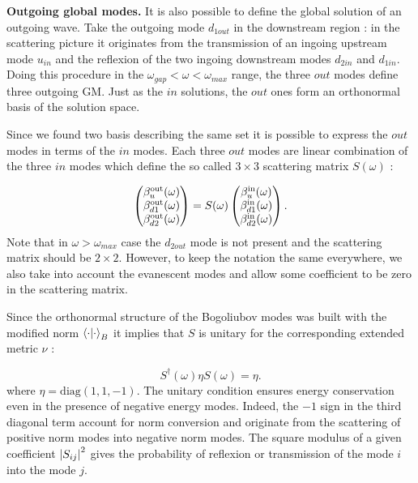 \bigskip

\textbf{Outgoing global modes.} It is also possible to define the global solution of an outgoing wave. Take the outgoing mode $d_{1out}$ in the downstream region : in the scattering picture it originates from 
 the transmission of an ingoing upstream mode $u_{in}$ and the reflexion of the two ingoing downstream modes $d_{2in}$ and $d_{1in}$. Doing this procedure in the $\omega_{gap}<\omega<\omega_{max}$ range, the three $out$ modes
define three outgoing GM. Just as the $in$ solutions, the $out$ ones form an orthonormal basis of the solution space.

Since we found two basis describing the same set it is possible to express the $out$ modes in terms of the $in$ modes. 
Each three $out$ modes are linear combination of the three $in$ modes which define the so called $3\times3$ scattering matrix $S(\omega)$ :

\begin{equation}
    \begin{pmatrix}
        \beta^{\mathrm{out}}_{u}(\omega) \\
        \beta^{\mathrm{out}}_{d1}(\omega) \\
        \beta^{\mathrm{out}}_{d2}(\omega)
        \end{pmatrix} =
    S(\omega)\begin{pmatrix}
        \beta^{\mathrm{in}}_{u}(\omega) \\
        \beta^{\mathrm{in}}_{d1}(\omega) \\
        \beta^{\mathrm{in}}_{d2}(\omega)
    \end{pmatrix}.
    \label{eq:scattering_matrix}
\end{equation}
Note that in $\omega>\omega_{max}$ case the $d_{2out}$ mode is not present and the scattering matrix should be $2\times2$. However, to keep 
the notation the same everywhere, we also take into account the evanescent modes and allow some coefficient to be zero in the scattering matrix.

Since the orthonormal structure of the Bogoliubov modes was built with the modified norm $\bra{\cdot}\ket{\cdot}_B$ it implies
that $S$ is unitary for the corresponding extended metric $\nu$ :

\begin{equation}
    S^\dagger(\omega)\eta S(\omega) = \eta.
    \label{eq:unitarity}
\end{equation}
where $\eta=\mathrm{diag}(1,1,-1)$. The unitary condition ensures energy conservation even in the presence of negative energy modes.  Indeed, the $-1$ sign in the third diagonal term account for norm conversion and originate from the scattering of positive norm modes into negative norm modes.
The square modulus of a given coefficient $\abs{S_{ij}}^2$ gives the probability of reflexion or transmission of the mode $i$ into the mode $j$.

